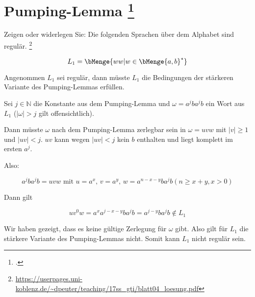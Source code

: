 \documentclass{bschlangaul-aufgabe}
\begin{document}

\let\m=\bMenge

\section{Pumping-Lemma
\footcite{}}

Zeigen oder widerlegen Sie: Die folgenden Sprachen über dem Alphabet
 sind regulär.
\footnote{\url{https://userpages.uni-koblenz.de/~dpeuter/teaching/17ss_gti/blatt04_loesung.pdf}}

\begin{bExkurs}
\bPumpingRegulaer
\end{bExkurs}

\begin{displaymath}
L_1 = \m{w w | w \in \m{a, b}^* }
\end{displaymath}

\begin{bAntwort}
\noindent
Angenommen $L_1$ sei regulär, dann müsste $L_1$ die Bedingungen der
stärkeren Variante des Pumping-Lemmas erfüllen.


\noindent
Sei $j \in \mathbb{N}$ die Konstante aus dem Pumping-Lemma und $\omega =
a^j b a^j b$ ein Wort aus $L_1$ ($|\omega| > j$ gilt offensichtlich).

Dann müsste $\omega$ nach dem Pumping-Lemma zerlegbar sein in $\omega =
uvw$ mit $|v| \geq 1$ und $|uv| < j$.
%
$uv$ kann wegen $|uv| < j$ kein $b$ enthalten und liegt komplett im
ersten $a^j$.

\noindent
Also:

\begin{displaymath}
a^j b a^j b = uvw \text{ mit }
u = a^x \text{, }
v = a^y \text{, }
w = a^{n - x - y} b a^j b (n \geq x + y, x > 0)
\end{displaymath}

\noindent
Dann gilt

\begin{displaymath}
u v^0 w = a^x a^{j - x - y} b a^j b = a^{j - y} b a^j b \notin L_1
\end{displaymath}

\noindent
Wir haben gezeigt, dass es keine gültige Zerlegung für $\omega$ gibt.
Also gilt für $L_1$ die stärkere Variante des Pumping-Lemmas nicht.
Somit kann $L_1$ nicht regulär sein.
\end{bAntwort}
\end{document}
